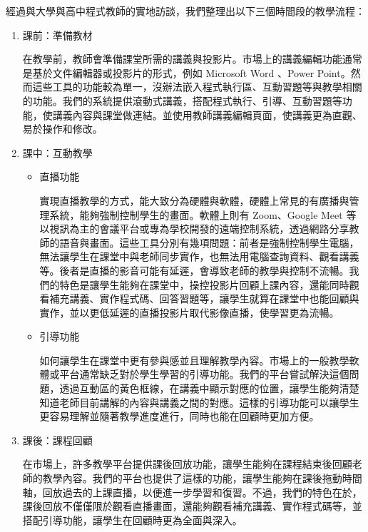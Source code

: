 經過與大學與高中程式教師的實地訪談，我們整理出以下三個時間段的教學流程：

\begin{enumerate}
  \setlength{\parindent}{2em}
  \item 課前：準備教材
    \par 在教學前，教師會準備課堂所需的講義與投影片。市場上的講義編輯功能通常是基於文件編輯器或投影片的形式，例如 Microsoft Word 、Power Point。然而這些工具的功能較為單一，沒辦法嵌入程式執行區、互動習題等與教學相關的功能。我們的系統提供滾動式講義，搭配程式執行、引導、互動習題等功能，使講義內容與課堂做連結。並使用教師講義編輯頁面，使講義更為直觀、易於操作和修改。
  \item 課中：互動教學
  \begin{itemize}
    \setlength{\parindent}{2em}
    \item 直播功能
      \par 實現直播教學的方式，能大致分為硬體與軟體，硬體上常見的有廣播與管理系統，能夠強制控制學生的畫面。軟體上則有 Zoom、Google Meet 等以視訊為主的會議平台或專為學校開發的遠端控制系統，透過網路分享教師的語音與畫面。這些工具分別有幾項問題：前者是強制控制學生電腦，無法讓學生在課堂中與老師同步實作，也無法用電腦查詢資料、觀看講義等。後者是直播的影音可能有延遲，會導致老師的教學與控制不流暢。我們的特色是讓學生能夠在課堂中，操控投影片回顧上課內容，還能同時觀看補充講義、實作程式碼、回答習題等，讓學生就算在課堂中也能回顧與實作，並以更低延遲的直播投影片取代影像直播，使學習更為流暢。
    \item 引導功能
      \par 如何讓學生在課堂中更有參與感並且理解教學內容。市場上的一般教學軟體或平台通常缺乏對於學生學習的引導功能。我們的平台嘗試解決這個問題，透過互動區的黃色框線，在講義中顯示對應的位置，讓學生能夠清楚知道老師目前講解的內容與講義之間的對應。這樣的引導功能可以讓學生更容易理解並隨著教學進度進行，同時也能在回顧時更加方便。
  \end{itemize}
  \item 課後：課程回顧
  \par 在市場上，許多教學平台提供課後回放功能，讓學生能夠在課程結束後回顧老師的教學內容。我們的平台也提供了這樣的功能，讓學生能夠在課後拖動時間軸，回放過去的上課直播，以便進一步學習和復習。不過，我們的特色在於，課後回放不僅僅限於觀看直播畫面，還能夠觀看補充講義、實作程式碼等，並搭配引導功能，讓學生在回顧時更為全面與深入。\\
\end{enumerate}

